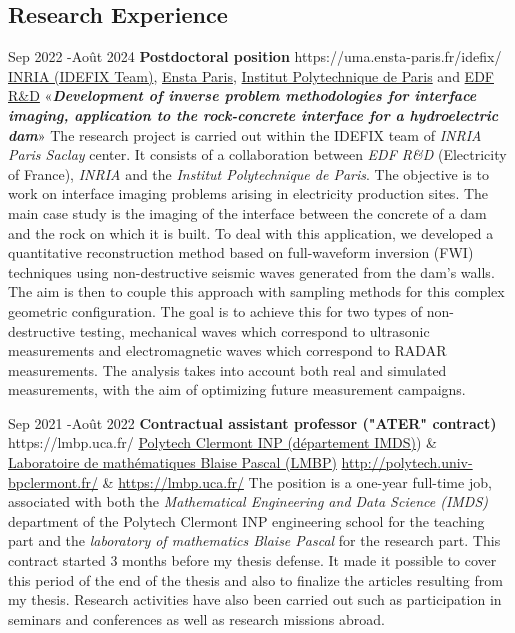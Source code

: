 \documentclass[10pt]{article} %
\begin{document}
\subsection{Research Experience}
\job
{Sep 2022 -}{Août 2024}
{\textbf{Postdoctoral position}}
{https://uma.ensta-paris.fr/idefix/}
{\href{https://uma.ensta-paris.fr/idefix/}{INRIA (IDEFIX Team)}, \href{https://www.ensta-paris.fr/}{Ensta Paris},  \href{https://www.ip-paris.fr/}{Institut Polytechnique de Paris} and \href{https://www.edf.fr/groupe-edf/inventer-l-avenir-de-l-energie/r-d-un-savoir-faire-mondial/5-ans-edf-lab-saclay/edf-lab-chatou-75-ans-de-recherche }{EDF R\&D}}
{«\textbf{\textit{Development of inverse problem methodologies for interface imaging, application to the rock-concrete interface for a hydroelectric dam}}»}
{The research project is carried out within the IDEFIX team of \textit{INRIA Paris Saclay} center. It consists of a collaboration between \textit{EDF  R\&D} (Electricity of France), \textit{INRIA} and the \textit{Institut Polytechnique de Paris}. The objective is to work on interface imaging problems arising in electricity production sites.
The main case study is the imaging of the interface between the concrete of a dam and the rock on which it is built. To deal with this application, we developed a quantitative reconstruction method based on  full-waveform inversion (FWI) techniques using non-destructive seismic waves generated from the dam's walls. The aim is then to couple this approach with sampling methods for this complex geometric configuration. The goal is to achieve this for two types of non-destructive testing, mechanical waves which correspond to ultrasonic measurements and electromagnetic waves which correspond to RADAR measurements. The analysis takes into account both real and simulated measurements, with the aim of optimizing future measurement campaigns.
}

\job
{Sep 2021 -}{Août 2022}
{\textbf{Contractual assistant professor ("ATER" contract)}}
{https://lmbp.uca.fr/}
{\href{http://polytech.univ-bpclermont.fr/}{Polytech Clermont INP (département IMDS)}) \&   \href{https://lmbp.uca.fr/}{Laboratoire de mathématiques Blaise Pascal  (LMBP)}}
{\href{http://polytech.univ-bpclermont.fr/}{http://polytech.univ-bpclermont.fr/}     \&   \href{https://lmbp.uca.fr/}{https://lmbp.uca.fr/}  }
{ The position is a one-year full-time job,  associated with both the \textit{Mathematical Engineering and Data Science (IMDS)} department of the Polytech Clermont INP engineering school for the teaching part and the \textit{laboratory of mathematics Blaise Pascal}  for the research part.
	This contract started 3 months before my thesis defense. It made it possible to cover this period of the end of the thesis and also to finalize the articles resulting from my thesis. Research activities have also been carried out such as participation in seminars and conferences as well as research missions abroad.
	}
\end{document}
